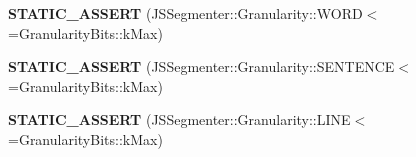 \begin{DoxyCompactItemize}
\mbox{\label{classv8_1_1internal_1_1JSSegmentIterator_afbb3758e446c82507b0929e2a07967e7}} 
{\bfseries S\+T\+A\+T\+I\+C\+\_\+\+A\+S\+S\+E\+RT} (J\+S\+Segmenter\+::\+Granularity\+::\+W\+O\+RD$<$=Granularity\+Bits\+::k\+Max)
\item 
\mbox{\label{classv8_1_1internal_1_1JSSegmentIterator_a8defb16a0771d496a26e7061d2eca5b6}} 
{\bfseries S\+T\+A\+T\+I\+C\+\_\+\+A\+S\+S\+E\+RT} (J\+S\+Segmenter\+::\+Granularity\+::\+S\+E\+N\+T\+E\+N\+CE$<$=Granularity\+Bits\+::k\+Max)
\item 
\mbox{\label{classv8_1_1internal_1_1JSSegmentIterator_abc9c074b71888015e6a5390cbfbcdd6d}} 
{\bfseries S\+T\+A\+T\+I\+C\+\_\+\+A\+S\+S\+E\+RT} (J\+S\+Segmenter\+::\+Granularity\+::\+L\+I\+NE$<$=Granularity\+Bits\+::k\+Max)
\end{DoxyCompactItemize}
